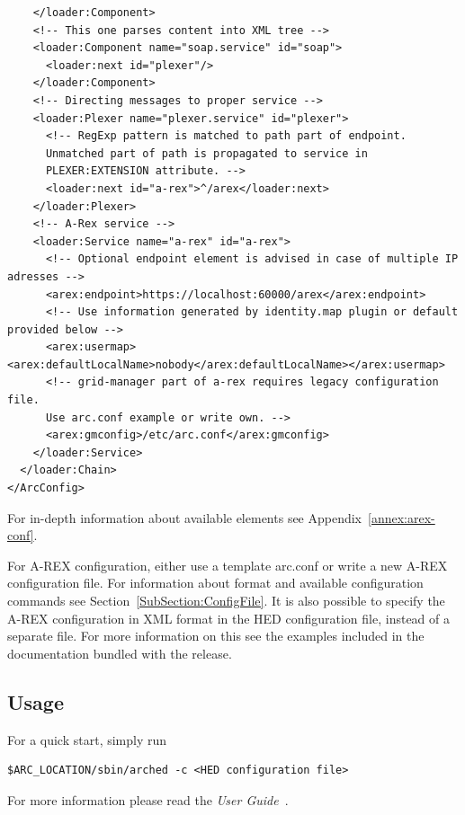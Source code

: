 \documentclass{article}                            %
\begin{document}
\begin{shaded}
\begin{verbatim}
    </loader:Component>
    <!-- This one parses content into XML tree -->
    <loader:Component name="soap.service" id="soap">
      <loader:next id="plexer"/>
    </loader:Component>
    <!-- Directing messages to proper service -->
    <loader:Plexer name="plexer.service" id="plexer">
      <!-- RegExp pattern is matched to path part of endpoint.
      Unmatched part of path is propagated to service in
      PLEXER:EXTENSION attribute. -->
      <loader:next id="a-rex">^/arex</loader:next>
    </loader:Plexer>
    <!-- A-Rex service -->
    <loader:Service name="a-rex" id="a-rex">
      <!-- Optional endpoint element is advised in case of multiple IP adresses -->
      <arex:endpoint>https://localhost:60000/arex</arex:endpoint>
      <!-- Use information generated by identity.map plugin or default provided below -->
      <arex:usermap><arex:defaultLocalName>nobody</arex:defaultLocalName></arex:usermap>
      <!-- grid-manager part of a-rex requires legacy configuration file.
      Use arc.conf example or write own. -->
      <arex:gmconfig>/etc/arc.conf</arex:gmconfig>
    </loader:Service>
  </loader:Chain>
</ArcConfig>
\end{verbatim}
\end{shaded}

For in-depth information about available elements see Appendix~\ref{annex:arex-conf}. 

For A-REX configuration, either use a template arc.conf or write a new
A-REX configuration file.  For information about format and available
configuration commands see Section~\ref{SubSection:ConfigFile}. It is
also possible to specify the A-REX configuration in XML format in the
HED configuration file, instead of a separate file. For more
information on this see the examples included in the documentation
bundled with the release.


\subsection{Usage}

For a quick start, simply run

\begin{shaded}
\begin{verbatim}
$ARC_LOCATION/sbin/arched -c <HED configuration file>
\end{verbatim}
\end{shaded}

For more information please read the \emph{User Guide}~\cite{userguide1}.
\end{document}
